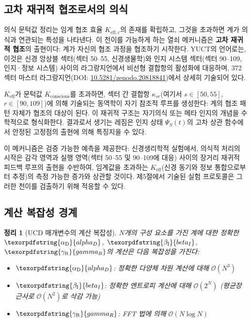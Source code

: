 \documentclass[11pt,a4paper]{article}
\newtheorem{theorem}{정리}
\DeclareRobustCommand{\alD}{\texorpdfstring{\ensuremath{\alpha_{\mathrm{D}}}}{alpha_D}}
\DeclareRobustCommand{\beI}{\texorpdfstring{\ensuremath{\beta_{\mathrm{I}}}}{beta_I}}
\DeclareRobustCommand{\gaR}{\texorpdfstring{\ensuremath{\gamma_{\mathrm{R}}}}{gamma_R}}
\newcommand{\eff}{\mathrm{eff}}
\begin{document}
	\subsection{고차 재귀적 협조로서의 의식}
	\label{subsec:recursive-coordination}
	
	의식 문턱값 정리는 임계 협조 효율 \(K_{\eff,c}\)의 존재를 확립하고, 그것을 초과하면 계가 의식과 연관되는 특성을 나타낸다. 이 천이를 가능하게 하는 열쇠 메커니즘은 \textbf{고차 재귀적 협조}의 출현이다: 계가 자신의 협조 과정을 협조하기 시작한다. YUCT의 언어로는, 이것은 신경 앙상블 섹터(섹터 50--55, 신경생물학)와 인지 시스템 섹터(섹터 90--109, 인지·정보 시스템) 사이의 라그랑지언에서 비선형 결합항의 활성화에 대응하며, 372 섹터 마스터 라그랑지언(DOI: \href{https://doi.org/10.5281/zenodo.20818841}{10.5281/zenodo.20818841})에서 상세히 기술되어 있다.
	
	\(K_{\eff}\)가 문턱값 \(K_{\mathrm{conscious}}\)를 초과하면, 섹터 간 결합항 \(\kappa_{sr}\)(여기서 \(s\in[50,55]\), \(r\in[90,109]\))에 의해 기술되는 동역학이 자기 참조적 루프를 생성한다: 계의 협조 패턴 자체가 협조의 대상이 된다. 이 재귀적 구조는 자기의식 또는 메타 인지의 개념을 수학적으로 형식화한다. 결과로서 생기는 레짐은 인지 상태 \(\Psi_S(t)\)의 고차 상관 함수에서 안정된 고정점의 출현에 의해 특징지을 수 있다.
	
	이 메커니즘은 검증 가능한 예측을 제공한다: 신경생리학적 실험에서, 의식적 처리의 시작은 감각 영역과 실행 영역(섹터 50--55 및 90--109에 대응) 사이의 장거리 재귀적 피드백 루프의 출현을 수반하여, 임계값을 초과하는 \(K_{\eff}\)(신경 동기와 정보 통합으로부터 추정)의 측정 가능한 증가와 상관할 것이다. 제5절에서 기술된 실험 프로토콜은 그러한 천이를 검출하기 위해 적응할 수 있다.
	
	\subsection{계산 복잡성 경계}
	
	\begin{theorem}[UCD 매개변수의 계산 복잡성]
		\(N\)개의 구성 요소를 가진 계에 대한 정확한 \(\alD\), \(\beI\), \(\gaR\)의 계산은 다음 복잡성을 가진다:
		\begin{itemize}
			\item \(\alD\): 정확한 다양체 차원 계산에 대해 \(\mathcal{O}(N^3)\)
			\item \(\beI\): 정확한 엔트로피 계산에 대해 \(\mathcal{O}(2^N)\) (평균장 근사로 \(\mathcal{O}(N^2)\)로 삭감 가능)
			\item \(\gaR\): FFT 법에 의해 \(\mathcal{O}(N \log N)\)
		\end{itemize}
	\end{theorem}
	
\end{document}
